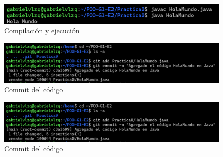 \documentclass[letterpaper,12pt]{article}
\begin{document}
\begin{figure}[H]
    \centering
    \includegraphics[width=14cm]{compilacion.png}
    \caption{Compilación y ejecución}
    \label{fig:java}
\end{figure}

\begin{figure}[H]
    \centering
    \includegraphics[width=14cm]{commit.png}
    \caption{Commit del código}
    \label{fig:java}
\end{figure}

\begin{figure}[H]
    \centering
    \includegraphics[width=14cm]{commit.png}
    \caption{Commit del código}
    \label{fig:java}
\end{figure}
\end{document}
